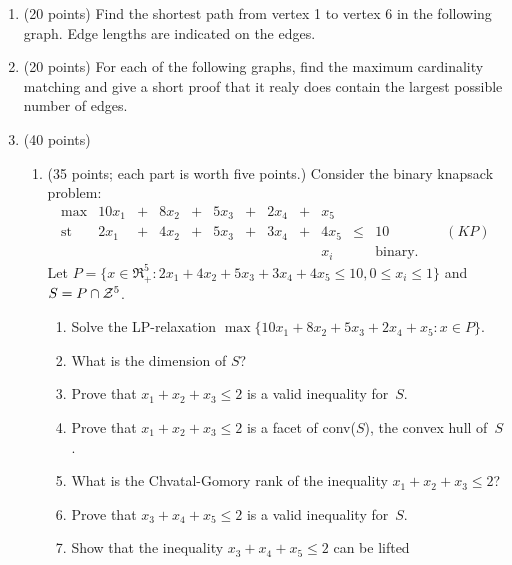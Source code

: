 \begin{enumerate}
   \item (20 points)
      Find the shortest path from vertex 1 to vertex 6 in the following
      graph. Edge lengths are indicated on the edges.
   \item (20 points)
      For each of the following graphs, find the maximum cardinality matching
      and give a short proof that it realy does contain the largest possible
      number of edges.
   \item (40 points)
      \begin{enumerate}
         \item (35 points; each part is worth five points.) \label{particular}
            Consider the binary knapsack problem:
            \begin{displaymath}
              \begin{array}{lrcrcrcrcrcl}
     \max        & 10x_1 & + & 8x_2 & + & 5x_3 & + & 2x_4 & + & x_5 \\
     \mbox{st }  &  2x_1 & + & 4x_2 & + & 5x_3 & + & 3x_4 & + & 4x_5 & \leq & 10
                                 \qquad \qquad (KP)  \\
                 &&&&&&&&& x_i && \mbox{binary.}
              \end{array}
            \end{displaymath}
            Let $P=\{x \in {\Re}^5_+:2x_1+4x_2+5x_3+3x_4+4x_5\leq 10,
                    0 \leq x_i \leq 1\}$ and~$S=P\cap{\cal Z}^5$.
            \begin{enumerate}
              \item
                 Solve the LP-relaxation
                 $\max\{10x_1+8x_2+5x_3+2x_4+x_5 : x \in P \}$.
              \item
                 What is the dimension of $S$?
              \item
                 Prove that $x_1+x_2+x_3 \leq 2$ is a valid inequality for~$S$.
              \item
                 Prove that $x_1+x_2+x_3 \leq 2$ is a facet of conv($S$),
                 the convex hull of~$S$.
              \item
                 What is the Chvatal-Gomory rank of the inequality
                 $x_1+x_2+x_3 \leq 2$?
              \item
                 Prove that $x_3+x_4+x_5 \leq 2$ is a valid inequality for~$S$.
              \item
                 Show that the inequality $x_3+x_4+x_5 \leq 2$ can be lifted

\end{enumerate}
\end{enumerate}
\end{enumerate}
